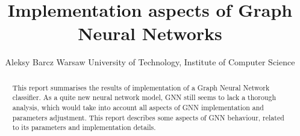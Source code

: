 \documentclass[]{spie}  %
\title{Implementation aspects of Graph Neural Networks}
\author{
Aleksy Barcz
\skiplinehalf
Warsaw University of Technology, Institute of Computer Science
}
\begin{document}
 
\maketitle 

\begin{abstract}
This report summarises the results of implementation of a Graph Neural Network~\cite{scarselli2009graph} classifier. As a quite new neural network model, GNN still seems to lack a thorough analysis, which would take into account all aspects of GNN implementation and parameters adjustment. This report describes some aspects of GNN behaviour, related to its parameters and implementation details.
\end{abstract}



\end{document}
